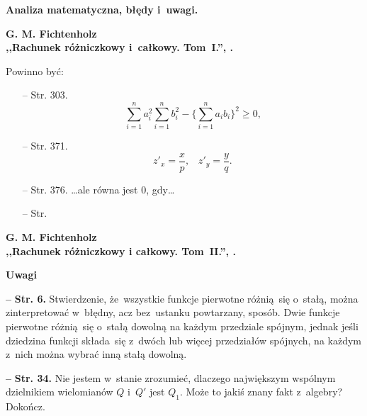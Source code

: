 \documentclass[a4paper,11pt]{article}
\newcommand{\spaceOne}{2em}
\newcommand{\spaceThree}{0.5em}
\newcommand{\tb}{\textbf}
\newcommand{\noi}{\noindent}
\newcommand{\start}{\noi \tb{--} {}}
\newcommand{\Center}[1]{\begin{center} #1 \end{center}}
\newcommand{\CenterTB}[1]{\Center{\tb{#1}}}
\newcommand{\Str}[1]{\tb{Str. #1.}}
\newcommand{\Dok}{{\color{red} Dokończ.}}
\newcommand{\Field}[1]{ \begin{center} {\Large \tb{#1} } \end{center} }
\newcommand{\Work}[1]{ \begin{center} {\large \tb{#1} } \end{center} }
\begin{document}
\Field{ Analiza matematyczna, błędy i~uwagi. }

\vspace{\spaceOne}



\Work{
  G. M. Fichtenholz \\
  ,,Rachunek różniczkowy i~całkowy. Tom~I.'', \cite{Fic05a}.}




Powinno być:
\begin{itemize}
\item[--] Str. 303.
$$\sum_{ i = 1 }^{ n } a_{ i }^{2} \sum_{ i = 1 }^{ n } b_{ i }^{ 2 } - \{ \sum_{ i = 1 }^{ n } a_{ i } b_{ i } \}^{ 2 } \geq 0 \textrm{,}$$
\item[--] Str. 371.
  $$z'_{ x } = \frac{ x }{ p } \textrm{,} \quad z'_{ y } = \frac{ y }{
    q } \textrm{.}$$
\item[--] Str. 376. \ldots ale równa jest 0, gdy\ldots
\item[--] Str.
\end{itemize}

\vspace{\spaceOne}



\Work{
  G. M. Fichtenholz \\
  ,,Rachunek różniczkowy i całkowy. Tom~II.'', \cite{Fic04}. }


\CenterTB{Uwagi}



\start \Str{6} Stwierdzenie, że~wszystkie funkcje pierwotne różnią~się
o~stałą, można zinterpretować w~błędny, acz bez~ustanku powtarzany,
sposób. Dwie funkcje pierwotne różnią~się o~stałą dowolną na każdym
przedziale spójnym, jednak jeśli dziedzina funkcji składa~się z~dwóch
lub więcej przedziałów spójnych, na każdym z~nich można wybrać inną
stałą dowolną.

\start \Str{34} Nie jestem w~stanie zrozumieć, dlaczego największym
wspólnym dzielnikiem wielomianów $Q$ i~$Q'$ jest $Q_{ 1 }$. Może to
jakiś znany fakt z~algebry? \Dok
\end{document}

